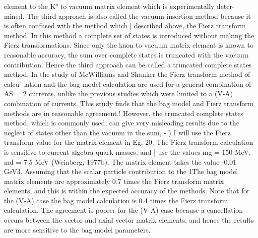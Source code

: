 \documentclass[twoside]{article}
\begin{document}
{{{{{{{{{{{{{{element to the K° to vacuum matrix element which is experimentally deter-
mined. The third approach is also called the vacuum insertion method
because it is often confused with the method which | described above,
the Fierz transform method. In this method a complete set of states is
introduced without making the Fierz transformations. Since only the
kaon to vacuum matrix element is known to reasonable accuracy, the sum
over complete states is truncated with the vacuum contribution. Hence
the third approach can be called a truncated complete states method. In
the study of McWilliams and Shanker the Fierz transform method of calcu-
lation and the bag model calculation are used for a general combination
of AS = 2 currents, unlike the previous studies which were limited to
a (V-A) combination of currents. This study finds that the bag model
and Fierz transform methods are in reasonable agreement.! However, the
truncated complete states method, which is commonly used, can give very
misleading results due to the neglect of states other than the vacuum
in the sum, - )
I will use the Fierz transform value for the matrix element
in Eg. 20. The Fierz transform calculation is sensitive to current
algebra quark masses, and | use the values mg = 150 MeV, md =
7.5 MeV (Weinberg, 1977b). The matrix element takes the value
-0.01 GeV3. Assuming that the scalar particle contribution to the
1The bag model matrix elements are approximately 0.7 times the Fierz
transform matrix elements, and this is within the expected accuracy of
the methods. Note that for the (V-A) case the bag model calculation is
0.4 times the Fierz transform calculation. The agreement is poorer for
the (V-A) case because a cancellation occurs between the vector and
axial vector matrix elements, and hence the results are more sensitive
to the bag model parameters.

}}}}}}}}}}}}}}
\end{document}
